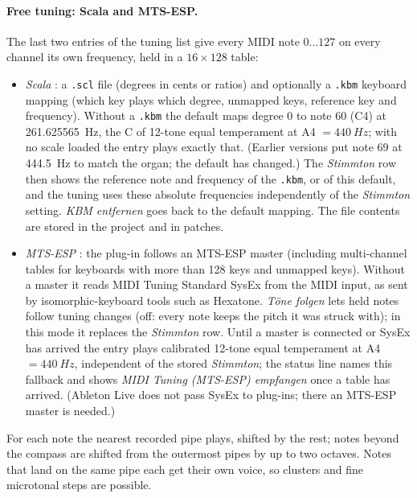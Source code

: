 \documentclass[11pt,a4paper,parskip=half,DIV=11,toc=bibliography]{scrartcl}
\newcommand{\ui}[1]{\emph{#1}}                 %
\newcommand{\code}[1]{\texttt{#1}}
\begin{document}
\paragraph{Free tuning: Scala and MTS-ESP.} The last two entries of the tuning list give every MIDI note
$0\dots127$ on every channel its own frequency, held in a $16\times128$ table:
\begin{itemize}
  \item \emph{Scala} \citep{scala}: a \code{.scl} file (degrees in cents or ratios) and optionally a
        \code{.kbm} keyboard mapping (which key plays which degree, unmapped keys, reference key and
        frequency). Without a \code{.kbm} the default maps degree 0 to note 60 (C4) at \SI{261.625565}{Hz}, the C of 12-tone equal
        temperament at A4 $=\SI{440}{Hz}$; with no scale loaded the entry plays exactly that. (Earlier versions put
        note 69 at \SI{444.5}{Hz} to match the organ; the default has changed.) The \ui{Stimmton} row then shows the
        reference note and frequency of the \code{.kbm}, or of this default, and the tuning uses these absolute
        frequencies independently of the \ui{Stimmton} setting. \ui{KBM entfernen} goes back to the default mapping. The
        file contents are stored in the project and in patches.
  \item \emph{MTS-ESP} \citep{mtsesp}: the plug-in follows an MTS-ESP master (including multi-channel
        tables for keyboards with more than 128 keys and unmapped keys). Without a master it reads
        MIDI Tuning Standard SysEx \citep{mts1992} from the MIDI input, as sent by isomorphic-keyboard
        tools such as Hexatone. \ui{Töne folgen} lets held notes follow tuning changes (off: every note keeps the pitch it
        was struck with); in this mode it replaces the \ui{Stimmton} row. Until a master is connected or SysEx has arrived the
        entry plays calibrated 12-tone equal temperament at A4 $=\SI{440}{Hz}$, independent of the stored \ui{Stimmton}; the
        status line names this fallback and shows \emph{MIDI Tuning (MTS-ESP) empfangen} once a table has arrived.
        (Ableton Live does not pass SysEx to plug-ins; there an MTS-ESP master is needed.)
\end{itemize}
For each note the nearest recorded pipe plays, shifted by the rest; notes beyond the compass are shifted
from the outermost pipes by up to two octaves. Notes that land on the same pipe each get their own voice,
so clusters and fine microtonal steps are possible.
\end{document}
